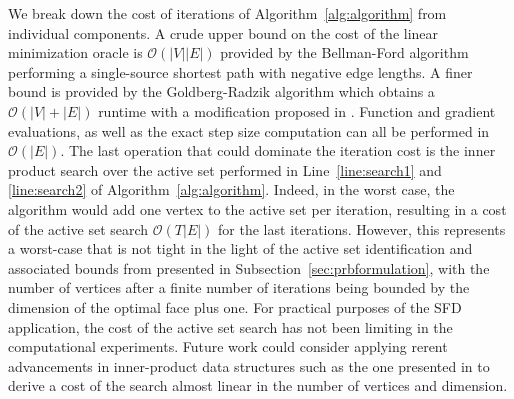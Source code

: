 \documentclass{ecai}
\begin{document}
We break down the cost of iterations of Algorithm~\ref{alg:algorithm} from individual components.
A crude upper bound on the cost of the linear minimization oracle is $\mathcal{O}(|V| |E|)$ provided by the Bellman-Ford algorithm performing a single-source shortest path with negative edge lengths.
A finer bound is provided by the Goldberg-Radzik algorithm \cite{goldberg1993heuristic} which obtains a $\mathcal{O}(|V| + |E|)$ runtime with a modification proposed in \cite{cherkassky1996shortest}.
Function and gradient evaluations, as well as the exact step size computation can all be performed in $\mathcal{O}(|E|)$.
The last operation that could dominate the iteration cost is the inner product search over the active set performed in Line~\ref{line:search1} and \ref{line:search2} of Algorithm~\ref{alg:algorithm}.
Indeed, in the worst case, the algorithm would add one vertex to the active set per iteration, resulting in a cost of the active set search $\mathcal{O}(T |E|)$ for the last iterations.
However, this represents a worst-case that is not tight in the light of the active set identification and associated bounds from \cite{bomze2020active,wirth2024pivoting} presented in Subsection~\ref{sec:prbformulation},
with the number of vertices after a finite number of iterations being bounded by the dimension of the optimal face plus one.
For practical purposes of the SFD application, the cost of the active set search has not been limiting in the computational experiments.
Future work could consider applying rerent advancements in inner-product data structures such as the one presented in \cite{xu2021breaking,song2022acceleratingfrankwolfealgorithmusing} to derive a cost of the search almost linear in the number of vertices and dimension.


\end{document}
